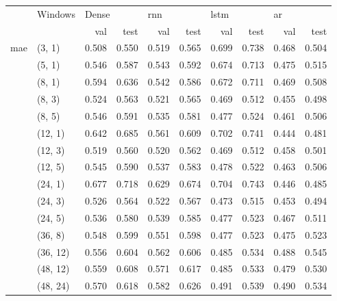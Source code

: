 \vspace{2em}
\begin{tabular}{ll|rr|rr|rr|rr}
\toprule
      &   Windows       & \multicolumn{2}{l}{Dense} & \multicolumn{2}{l}{\acrshort{rnn}} & \multicolumn{2}{l}{\acrshort{lstm}} & \multicolumn{2}{l}{\acrshort{ar}} \\*
      &          & val & test & val & test & val & test & val & test \\*
\midrule
\multirow{15}{*}{\acrshort{mae}} & (3, 1) &     0.508 &      0.550 &   0.519 &    0.565 &    0.699 &     0.738 &  0.468 &   0.504 \\*
      & (5, 1) &     0.546 &      0.587 &   0.543 &    0.592 &    0.674 &     0.713 &  0.475 &   0.515 \\*
      & (8, 1) &     0.594 &      0.636 &   0.542 &    0.586 &    0.672 &     0.711 &  0.469 &   0.508 \\*
      & (8, 3) &     0.524 &      0.563 &   0.521 &    0.565 &    0.469 &     0.512 &  0.455 &   0.498 \\*
      & (8, 5) &     0.546 &      0.591 &   0.535 &    0.581 &    0.477 &     0.524 &  0.461 &   0.506 \\*
      & (12, 1) &     0.642 &      0.685 &   0.561 &    0.609 &    0.702 &     0.741 &  0.444 &   0.481 \\*
      & (12, 3) &     0.519 &      0.560 &   0.520 &    0.562 &    0.469 &     0.512 &  0.458 &   0.501 \\*
      & (12, 5) &     0.545 &      0.590 &   0.537 &    0.583 &    0.478 &     0.522 &  0.463 &   0.506 \\*
      & (24, 1) &     0.677 &      0.718 &   0.629 &    0.674 &    0.704 &     0.743 &  0.446 &   0.485 \\*
      & (24, 3) &     0.526 &      0.564 &   0.522 &    0.567 &    0.473 &     0.515 &  0.453 &   0.494 \\*
      & (24, 5) &     0.536 &      0.580 &   0.539 &    0.585 &    0.477 &     0.523 &  0.467 &   0.511 \\*
      & (36, 8) &     0.548 &      0.599 &   0.551 &    0.598 &    0.477 &     0.523 &  0.475 &   0.523 \\*
      & (36, 12) &     0.556 &      0.604 &   0.562 &    0.606 &    0.485 &     0.534 &  0.488 &   0.545 \\*
      & (48, 12) &     0.559 &      0.608 &   0.571 &    0.617 &    0.485 &     0.533 &  0.479 &   0.530 \\*
      & (48, 24) &     0.570 &      0.618 &   0.582 &    0.626 &    0.491 &     0.539 &  0.490 &   0.534 \\*
\bottomrule

\end{tabular}

